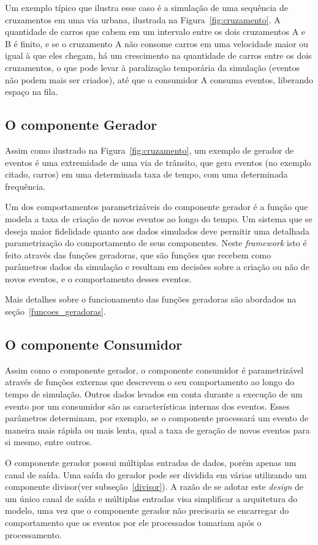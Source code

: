 Um exemplo típico que ilustra esse caso é a simulação de uma sequência de cruzamentos em uma via urbana, ilustrada na Figura~\ref{fig:cruzamento}. A quantidade de carros que cabem em um intervalo entre os dois cruzamentos A e B é finito, e se o cruzamento A não consome carros em uma velocidade maior ou igual à que eles chegam, há um crescimento na quantidade de carros entre os dois cruzamentos, o que pode levar à paralização temporária da simulação (eventos não podem mais ser criados), até que o consumidor A consuma eventos, liberando espaço na fila.

\subsection{O componente Gerador}

Assim como ilustrado na Figura~\ref{fig:cruzamento}, um exemplo de gerador de eventos é uma extremidade de uma via de trânsito, que gera eventos (no exemplo citado, carros) em uma determinada taxa de tempo, com uma determinada frequência.

Um dos comportamentos parametrizáveis do componente gerador é a função que modela a taxa de criação de novos eventos ao longo do tempo. Um sistema que se deseja maior fidelidade quanto aos dados simulados deve permitir uma detalhada parametrização do comportamento de seus componentes. Neste \textit{framework} isto é feito através das funções geradoras, que são funções que recebem como parâmetros dados da simulação e resultam em decisões sobre a criação ou não de novos eventos, e o comportamento desses eventos.

Mais detalhes sobre o funcionamento das funções geradoras são abordados na seção~\ref{funcoes_geradoras}.

\subsection{O componente Consumidor}

Assim como o componente gerador, o componente consumidor é parametrizável através de funções externas que descrevem o seu comportamento ao longo do tempo de simulação. Outros dados levados em conta durante a execução de um evento por um consumidor são as características internas dos eventos. Esses parâmetros determinam, por exemplo, se o componente processará um evento de maneira mais rápida ou mais lenta, qual a taxa de geração de novos eventos para si mesmo, entre outros.

O componente gerador possui múltiplas entradas de dados, porém apenas um canal de saída. Uma saída do gerador pode ser dividida em várias utilizando um componente divisor(ver subseção~\ref{divisor}). A razão de se adotar este \textit{design} de um único canal de saída e múltiplas entradas visa simplificar a arquitetura do modelo, uma vez que o componente gerador não precisaria se encarregar do comportamento que os eventos por ele processados tomariam após o processamento.

